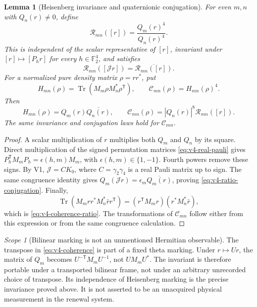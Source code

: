 \documentclass[11pt]{article}
\newtheorem{lemma}[lemma]{Lemma}
\theoremstyle{definition}
\theoremstyle{remark}
\newtheorem{scope}[scope]{Scope}
\newcommand{\F}{\mathbb F}
\newcommand{\Tr}{\operatorname{Tr}}
\newcommand{\Jq}{\mathcal J}
\begin{document}
\begin{lemma}[Heisenberg invariance and quaternionic conjugation]
\label{lem:v4-phase-transform}
For even $m,n$ with $Q_n(r)\ne0$, define
\begin{equation}
 \mathcal R_{mn}([r])=\frac{Q_m(r)^4}{Q_n(r)^4}.
 \label{eq:v4-source-ratio}
\end{equation}
This is independent of the scalar representative of $[r]$, invariant under
$[r]\mapsto[P_h r]$ for every $h\in\F_2^4$, and satisfies
\begin{equation}
 \mathcal R_{mn}([\Jq r])
 =\overline{\mathcal R_{mn}([r])}.
 \label{eq:v4-ratio-conjugation}
\end{equation}
For a normalized pure density matrix $\rho=rr^*$, put
\begin{equation}
 H_{mn}(\rho)=\Tr(M_m\rho M_n^*\rho^{\mathsf T}),
 \qquad \mathcal C_{mn}(\rho)=H_{mn}(\rho)^4.
 \label{eq:v4-coherence}
\end{equation}
Then
\begin{equation}
 H_{mn}(\rho)=Q_m(r)\overline{Q_n(r)},\qquad
 \mathcal C_{mn}(\rho)=|Q_n(r)|^8\mathcal R_{mn}([r]).
 \label{eq:v4-coherence-ratio}
\end{equation}
The same invariance and conjugation laws hold for $\mathcal C_{mn}$.
\end{lemma}
\begin{proof}
A scalar multiplication of $r$ multiplies both $Q_m$ and $Q_n$ by its
square. Direct multiplication of the signed permutation matrices
\eqref{eq:v4-real-pauli} gives
$P_h^{\mathsf T}M_mP_h=\epsilon(h,m)M_m$, with
$\epsilon(h,m)\in\{1,-1\}$. Fourth powers remove these signs. By V1,
$\Jq=C K_0$, where $C=\gamma_2\gamma_4$ is a real Pauli matrix up to
sign. The same congruence identity gives
$Q_m(\Jq r)=\epsilon_m\overline{Q_m(r)}$, proving
\eqref{eq:v4-ratio-conjugation}.
Finally,
\[
 \Tr(M_mrr^*M_n^*\bar r r^{\mathsf T})
 =(r^{\mathsf T}M_mr)(r^*M_n^*\bar r),
\]
which is \eqref{eq:v4-coherence-ratio}. The transformations of
$\mathcal C_{mn}$ follow either from this expression or from the same
congruence calculation.
\end{proof}

\begin{scope}[Bilinear marking is not an unmentioned Hermitian observable]
The transpose in \eqref{eq:v4-coherence} is part of a fixed theta marking.
Under $r\mapsto Ur$, the matrix of $Q_m$ becomes
$U^{-\mathsf T}M_mU^{-1}$, not $UM_mU^*$. The invariant is therefore
portable under a transported bilinear frame, not under an arbitrary
unrecorded choice of transpose. Its independence of Heisenberg marking is
the precise invariance proved above. It is not asserted to be an
unacquired physical measurement in the renewal system.
\end{scope}
\end{document}
